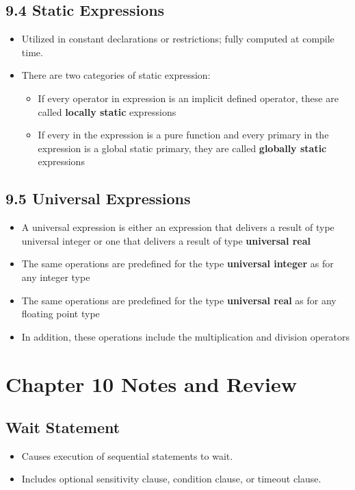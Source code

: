 \documentclass[a4paper,12pt]{article}
\begin{document}
	
	\subsection*{9.4 Static Expressions}
	\begin{itemize}
		\item Utilized in constant declarations or restrictions; fully computed at compile time.
		\item There are two categories of static expression:
		\begin{itemize}
			\item If every operator in expression is an implicit defined operator, these are called \textbf{locally static}  expressions
			\item If every in the expression is a pure function and every primary in the expression is a global static primary, they are called \textbf{globally static}  expressions
		\end{itemize}
	\end{itemize}
	
	\subsection*{9.5 Universal Expressions}
	\begin{itemize}
		\item A universal expression is either an expression that delivers a result of type universal integer or one that delivers a result of type \textbf{universal real}
		\item The same operations are predefined for the type \textbf{universal integer} as for any integer type
		\item The same operations are predefined for the type \textbf{universal real} as for any floating point type
		\item In addition, these operations include the multiplication and division operators
		
	\end{itemize}
	
	
	\section*{Chapter 10 Notes and Review}
	
	
	\subsection*{Wait Statement}
	\begin{itemize}
		\item Causes execution of sequential statements to wait.
		\item Includes optional sensitivity clause, condition clause, or timeout clause.
	\end{itemize}
	
\end{document}
